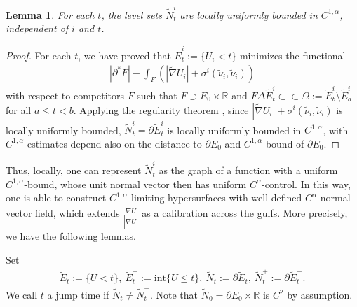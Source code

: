 \documentclass[11pt, letterpaper]{amsart}
\newtheorem{lem}[thm]{Lemma}
\theoremstyle{definition}
\theoremstyle{remark}
\begin{document}
\begin{lem}\label{lem-local-C1alpha}
	For each $t$, the level sets $\tilde{N}^{i}_t $ are locally uniformly bounded in $C^{1, \alpha }$, independent of $i$ and $t$.
\end{lem}
\begin{proof}
	For each $t$, we have proved that $\tilde{E}^{i}_t:=\{U_i < t\} $ minimizes the functional 
	\begin{align*}
		|\partial ^* F| - \int_{F} \left( |\tilde{\nabla }U_i| + \sigma ^{i} (\tilde{\nu }_i, \tilde{\nu }_i) \right)
	\end{align*} 
	with respect to competitors $F$ such that $F \supset E_0 \times \mathbb{R}$ and $F \Delta \tilde{E}^{i}_t \subset \subset \Omega := \tilde{E}^{i}_{b} \setminus \tilde{E}^{i}_{a} $ for all $a \leq t < b$.
	Applying the regularity theorem \cite[Theorem 1.3]{HI01}, since $|\tilde{\nabla }U_i| + \sigma^{i} (\tilde{\nu }_i, \tilde{\nu }_i) $ is locally uniformly bounded, $\tilde{N}^{i}_{t} = \partial \tilde{E}^{i}_t$ is locally uniformly bounded in $C^{1,\alpha }$, with $C^{1,\alpha }$-estimates depend also on the distance to $\partial E_0$ and $C^{1,\alpha }$-bound of $\partial E_0$. 
\end{proof}

Thus, locally, one can represent $\tilde{N}^{i}_t$ as the graph of a function with a uniform $C^{1,\alpha }$-bound, whose unit normal vector then has uniform $C^{\alpha }$-control. In this way, one is able to construct $C^{1,\alpha }$-limiting hypersurfaces with well defined $C^{\alpha }$-normal vector field, which extends $\frac{\tilde{\nabla }U}{|\tilde{\nabla }U|}$ as a calibration across the gulfs. More precisely, we have the following lemmas. 

Set 
\begin{align*}
	\tilde{E}_{t}:= \{U<t\} ,\ \tilde{E}^{+}_{t}:= \mathrm{int} \{U \leq t\} ,\ \tilde{N}_t:= \partial \tilde{E}_t,\ \tilde{N}^{+}_t:= \partial \tilde{E}^{+}_{t} . 
\end{align*} 
We call $t$ a jump time if $\tilde{N}_t \neq \tilde{N}^{+}_t$. Note that $\tilde{N}_{0} = \partial E_0 \times \mathbb{R}$ is $C^2$ by assumption.
\end{document}
